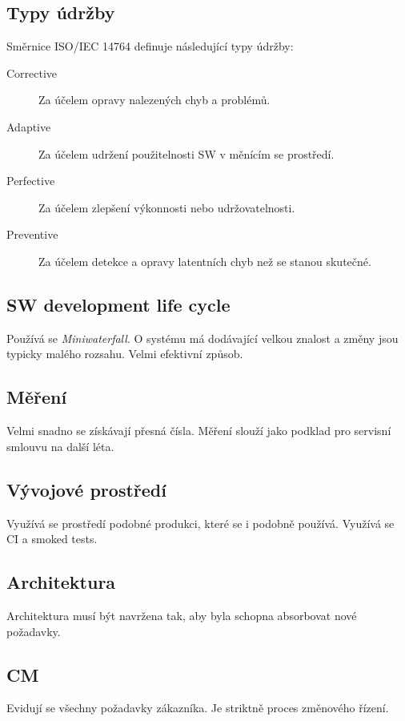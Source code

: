   \subsection{Typy údržby}
    Směrnice ISO/IEC 14764 definuje následující typy údržby:

    \begin{description}
      \item[Corrective] Za účelem opravy nalezených chyb a problémů.
      \item[Adaptive] Za účelem udržení použitelnosti SW v měnícím se prostředí.
      \item[Perfective] Za účelem zlepšení výkonnosti nebo udržovatelnosti.
      \item[Preventive] Za účelem detekce a opravy latentních chyb než se stanou skutečné.
    \end{description}

  \subsection{SW development life cycle}
    Používá se \emph{Miniwaterfall}. O systému má dodávající velkou znalost a změny jsou typicky malého rozsahu.
    Velmi efektivní způsob.

  \subsection{Měření}
    Velmi snadno se získávají přesná čísla. Měření slouží jako podklad pro servisní smlouvu na další léta.

  \subsection{Vývojové prostředí}
    Využívá se prostředí podobné produkci, které se i podobně používá. Využívá se CI a smoked tests.

  \subsection{Architektura}
    Architektura musí být navržena tak, aby byla schopna absorbovat nové požadavky.

  \subsection{CM}
    Evidují se všechny požadavky zákazníka. Je striktně proces změnového řízení.


